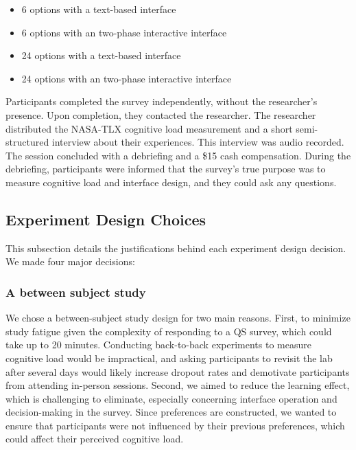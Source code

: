 \begin{itemize}
    \item 6 options with a text-based interface
    \item 6 options with an two-phase interactive interface
    \item 24 options with a text-based interface
    \item 24 options with an two-phase interactive interface
\end{itemize}

Participants completed the survey independently, without the researcher's presence. Upon completion, they contacted the researcher. The researcher distributed the NASA-TLX cognitive load measurement and a short semi-structured interview about their experiences. This interview was audio recorded. The session concluded with a debriefing and a \$15 cash compensation. During the debriefing, participants were informed that the survey's true purpose was to measure cognitive load and interface design, and they could ask any questions.

\subsection{Experiment Design Choices}
This subsection details the justifications behind each experiment design decision. We made four major decisions:

\subsubsection{A between subject study}
We chose a between-subject study design for two main reasons. First, to minimize study fatigue given the complexity of responding to a QS survey, which could take up to 20 minutes. Conducting back-to-back experiments to measure cognitive load would be impractical, and asking participants to revisit the lab after several days would likely increase dropout rates and demotivate participants from attending in-person sessions. Second, we aimed to reduce the learning effect, which is challenging to eliminate, especially concerning interface operation and decision-making in the survey. Since preferences are constructed, we wanted to ensure that participants were not influenced by their previous preferences, which could affect their perceived cognitive load.

